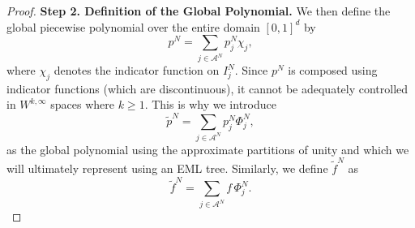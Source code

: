 \documentclass{article}
\newcommand{\be}{\begin{equation}}
\newcommand{\ee}{\end{equation}}
\newcommand{\WnormO}[3]{\left\lVert #1 \right\rVert_{W^{#2, #3} ([0,1]^d)}}
\numberwithin{Def}{section}
\begin{document}
\begin{proof}
{\bf{Step 2. Definition of the Global Polynomial.}} We then define the global piecewise polynomial over the entire domain $[0,1]^d$ by
\begin{equation}
    p^N = \sum_{j \in \mathcal{A}^N} p_j^N \chi_j,
\end{equation}
where $\chi_j$ denotes the indicator function on $I_j^N$. Since $p^N$ is composed using indicator functions (which are discontinuous), it cannot be adequately controlled in $W^{k, \infty}$ spaces where $k \geq 1$. This is why we introduce
\begin{equation}
    \tilde{p}^N = \sum_{j \in \mathcal{A}^N} p_j^N \Phi_j^{N},
\end{equation}
as the global polynomial using the approximate partitions of unity and which we will ultimately represent using an EML tree. Similarly, we define $\tilde{f}^N$ as
\begin{equation}
    \tilde{f}^N = \sum_{j \in \mathcal{A}^N} f \, \Phi_j^{N}.
\end{equation}


\end{proof}
\end{document}
